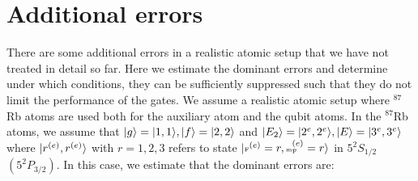 \section{Additional errors} 

There are some additional errors in a realistic atomic setup that we have not
treated in detail so far. Here we estimate the dominant errors and determine
under which conditions, they can be sufficiently suppressed such that they do
not limit the performance of the gates. We assume a realistic atomic setup where
${}^{87}$Rb atoms are used both for the auxiliary atom and the qubit atoms. In
the ${}^{87}$Rb atoms, we assume that $| g \rangle=| 1,1 \rangle, | f \rangle=| 2,2 \rangle$ and
$| E_{2} \rangle=| 2^{e},2^{e} \rangle, | E \rangle=| 3^{e},3^{e} \rangle$ where
$| r^{(e)},r^{(e)} \rangle$ with $r=1,2,3$ refers to state
$| \mbox{\tiny F}^{(e)}=r,\mbox{\tiny m}_{\mbox{\tiny F}}^{(e)}=r \rangle$ in $5^{2}S_{1/2}$
$(5^{2}P_{3/2})$. In this case, we estimate that the dominant errors are:
